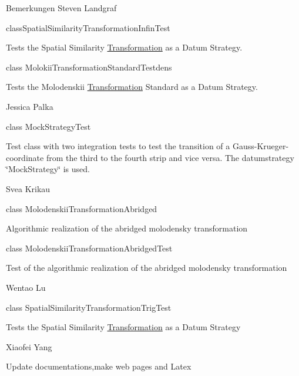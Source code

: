\begin{DoxyRemark}{Bemerkungen}
Steven Landgraf ~\newline
 
\begin{DoxyItemize}
\item class\+Spatial\+Similarity\+Transformation\+Infin\+Test 
\item Tests the Spatial Similarity \mbox{\hyperlink{class_transformation}{Transformation}} as a Datum Strategy. 
\item class Molokii\+Transformation\+Standard\+Testdens 
\item Tests the Molodenskii \mbox{\hyperlink{class_transformation}{Transformation}} Standard as a Datum Strategy. 
\end{DoxyItemize}

Jessica Palka ~\newline
 
\begin{DoxyItemize}
\item class Mock\+Strategy\+Test 
\item Test class with two integration tests to test the transition of a Gauss-\/\+Krueger-\/coordinate from the third to the fourth strip and vice versa. The datumstrategy \char`\"{}\+Mock\+Strategy\char`\"{} is used. 
\end{DoxyItemize}

Svea Krikau ~\newline
 
\begin{DoxyItemize}
\item class Molodenskii\+Transformation\+Abridged 
\item Algorithmic realization of the abridged molodensky transformation 
\item class Molodenskii\+Transformation\+Abridged\+Test 
\item Test of the algorithmic realization of the abridged molodensky transformation 
\end{DoxyItemize}

Wentao Lu ~\newline
 
\begin{DoxyItemize}
\item class Spatial\+Similarity\+Transformation\+Trig\+Test  
\item Tests the Spatial Similarity \mbox{\hyperlink{class_transformation}{Transformation}} as a Datum Strategy  
\end{DoxyItemize}

Xiaofei Yang ~\newline
 
\begin{DoxyItemize}
\item Update documentations,make web pages and Latex  
\end{DoxyItemize}
\end{DoxyRemark}
